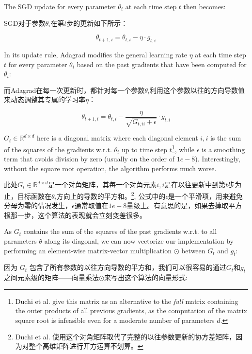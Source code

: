 \documentclass{article}
\begin{document}
The SGD update for every parameter $\theta_i$ at each time step $t$ then becomes:

SGD对于参数$\theta_i$在第$t$步的更新如下所示：

\begin{equation}
\theta_{t+1, i} = \theta_{t, i} - \eta \cdot g_{t, i}
\end{equation}

In its update rule, Adagrad modifies the general learning rate $\eta$ at each time step $t$ for every parameter $\theta_i$ based on the past gradients that have been computed for $\theta_i$:

而Adagrad在每一次更新时，都针对每一个参数$\theta_i$利用这个参数以往的方向导数值来动态调整其专属的学习率$\eta$：

\begin{equation}
\theta_{t+1, i} = \theta_{t, i} - \frac{\eta}{\sqrt{G_{t, ii} + \epsilon}} \cdot g_{t, i}
\end{equation}

$G_{t} \in \mathbb{R}^{d \times d} $ here is a diagonal matrix where each diagonal element $i, i$ is the sum of the squares of the gradients w.r.t. $\theta_i$ up to time step $t$\footnote{Duchi et al. \cite{Duchi2011} give this matrix as an alternative to the \emph{full} matrix containing the outer products of all previous gradients, as the computation of the matrix square root is infeasible even for a moderate number of parameters $d$.}, while $\epsilon$ is a smoothing term that avoids division by zero (usually on the order of $1e-8$). Interestingly, without the square root operation, the algorithm performs much worse.

此处$G_{t} \in \mathbb{R}^{d \times d} $是一个对角矩阵，其每一个对角元素$i, i$是在以往更新中到第$t$步为止，目标函数在$\theta_i$方向上的导数的平方和。\footnote{Duchi et al. \cite{Duchi2011} 使用这个对角矩阵取代了完整的以往参数更新的协方差矩阵，因为对整个高维矩阵进行开方运算不划算。}, 公式中的$\epsilon$是一个平滑项，用来避免分母为零的情况发生，$\epsilon$通常取值在$1e-8$量级上。有意思的是，如果去掉取平方根那一步，这个算法的表现就会立刻变差很多。

As $G_{t}$ contains the sum of the squares of the past gradients w.r.t. to all parameters $\theta$ along its diagonal, we can now vectorize our implementation by performing an element-wise matrix-vector multiplication $\odot$ between $G_{t}$ and $g_{t}$:

因为 $G_{t}$ 包含了所有参数的以往方向导数的平方和，我们可以很容易的通过$G_{t}$和$g_{t}$之间元素级的矩阵——向量乘法$\odot$来写出这个算法的向量形式:
\end{document}
